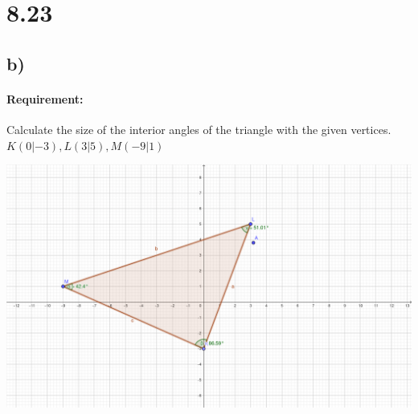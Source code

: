 \section{8.23}
\subsection{b)}
\paragraph{Requirement:}
Calculate the size of the interior angles of the triangle with the given
vertices. \\
$K(0|-3), L(3|5), M(-9|1)$

\includegraphics[width=\linewidth]{images/8-23.png}

\def\va{\begin{pmatrix}
   3 \\ 
   8
\end{pmatrix}}
\def\vb{\begin{pmatrix}
   -12 \\ 
   -4
\end{pmatrix}}
\def\vc{\begin{pmatrix}
   9 \\ 
   -4
\end{pmatrix}}

